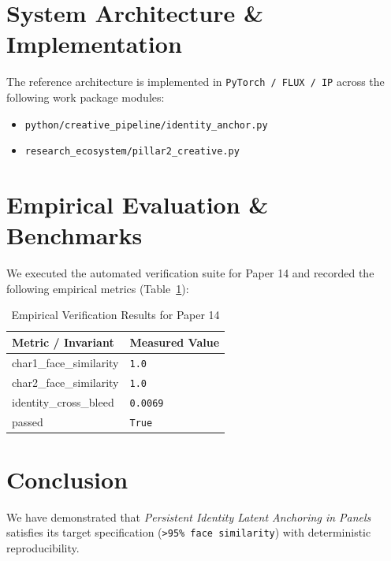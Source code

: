 \documentclass[10pt,twocolumn]{article}
\begin{document}
\section{System Architecture \& Implementation}
The reference architecture is implemented in \texttt{PyTorch / FLUX / IP} across the following work package modules:
\begin{itemize}
  \item \texttt{python/creative\_pipeline/identity\_anchor.py}
  \item \texttt{research\_ecosystem/pillar2\_creative.py}
\end{itemize}

\section{Empirical Evaluation \& Benchmarks}
We executed the automated verification suite for Paper 14 and recorded the following empirical metrics (Table~\ref{tab:metrics}):

\begin{table}[htbp]
\centering
\caption{Empirical Verification Results for Paper 14}
\label{tab:metrics}
\begin{tabular}{ll}
\toprule
\textbf{Metric / Invariant} & \textbf{Measured Value} \\
\midrule
    char1\_face\_similarity & \texttt{1.0} \\
    char2\_face\_similarity & \texttt{1.0} \\
    identity\_cross\_bleed & \texttt{0.0069} \\
    passed & \texttt{True} \\
\bottomrule
\end{tabular}
\end{table}

\section{Conclusion}
We have demonstrated that \textit{Persistent Identity Latent Anchoring in Panels} satisfies its target specification (\texttt{>95\% face similarity}) with deterministic reproducibility.



\end{document}
